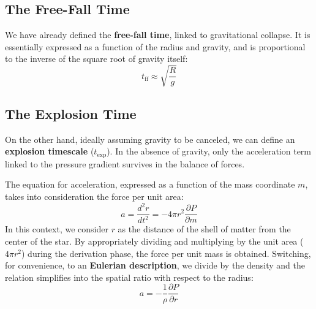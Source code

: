 \subsection{The Free-Fall Time}
We have already defined the \textbf{free-fall time}, linked to gravitational collapse. It is essentially expressed as a function of the radius and gravity, and is proportional to the inverse of the square root of gravity itself:
\begin{equation}
t_{\text{ff}} \approx \sqrt{\frac{R}{g}}
\end{equation}

\subsection{The Explosion Time}
On the other hand, ideally assuming gravity to be canceled, we can define an \textbf{explosion timescale} ($t_{\text{exp}}$). In the absence of gravity, only the acceleration term linked to the pressure gradient survives in the balance of forces.

The equation for acceleration, expressed as a function of the mass coordinate $m$, takes into consideration the force per unit area:
\begin{equation}
a = \frac{d^2 r}{dt^2} = - 4\pi r^2 \frac{\partial P}{\partial m}
\end{equation}
In this context, we consider $r$ as the distance of the shell of matter from the center of the star. By appropriately dividing and multiplying by the unit area ($4\pi r^2$) during the derivation phase, the force per unit mass is obtained.
Switching, for convenience, to an \textbf{Eulerian description}, we divide by the density and the relation simplifies into the spatial ratio with respect to the radius:
\begin{equation}
a = - \frac{1}{\rho} \frac{\partial P}{\partial r}
\end{equation}

